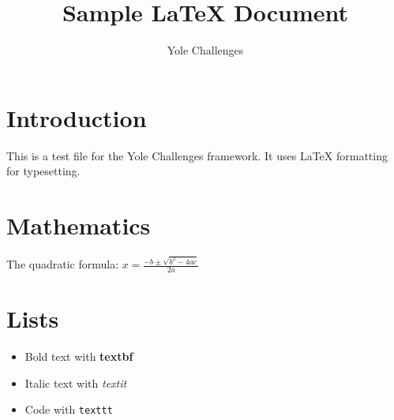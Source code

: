 \documentclass{article}
\title{Sample LaTeX Document}
\author{Yole Challenges}
\begin{document}
\maketitle

\section{Introduction}

This is a test file for the Yole Challenges framework.
It uses \LaTeX{} formatting for typesetting.

\section{Mathematics}

The quadratic formula: $x = \frac{-b \pm \sqrt{b^2-4ac}}{2a}$

\section{Lists}

\begin{itemize}
  \item Bold text with \textbf{textbf}
  \item Italic text with \textit{textit}
  \item Code with \texttt{texttt}
\end{itemize}
\end{document}
